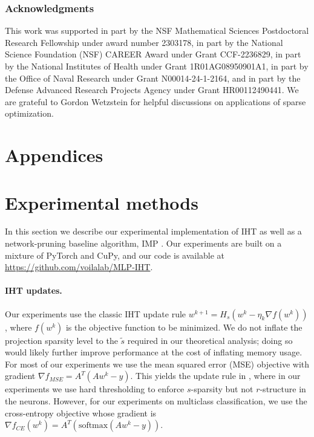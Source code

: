 \documentclass{article} %
\newcommand{\measurement}{y}
\newcommand{\w}{\ensuremath{w}}
\newcommand{\1}{\ensuremath{{\sf (i)}}}
\newcommand{\2}{\ensuremath{{\sf (ii)}}}
\newcommand{\3}{\ensuremath{{\sf (iii)}}}
\newcommand{\4}{\ensuremath{{\sf (iv)}}}
\newcommand{\5}{\ensuremath{{\sf (v)}}}
\newcommand{\6}{\ensuremath{{\sf (vi)}}}
\begin{document}
\subsubsection*{Acknowledgments}
This work was supported in part by the NSF Mathematical Sciences Postdoctoral Research Fellowship under award number 2303178, in part by the National Science Foundation (NSF) CAREER Award under Grant CCF-2236829, in part by the National Institutes of Health under Grant 1R01AG08950901A1, in part by the Office of Naval Research under Grant N00014-24-1-2164, and in part by the Defense Advanced Research Projects Agency under Grant HR00112490441.
We are grateful to Gordon Wetzstein for helpful discussions on applications of sparse optimization.


\clearpage




\clearpage
\appendix
\section*{Appendices}



\section{Experimental methods}
\label{sec:experimental_methods}

In this section we describe our experimental implementation of IHT as well as a network-pruning baseline algorithm, IMP \citep{frankle2018lottery}. Our experiments are built on a mixture of PyTorch and CuPy, and our code is available at \url{https://github.com/voilalab/MLP-IHT}.

\paragraph{IHT updates.}
Our experiments use the classic IHT update rule $\w^{k+1} = H_s(\w^k - \eta_k\nabla f(\w^k))$, where $f(\w^k)$ is the objective function to be minimized. We do not inflate the projection sparsity level to the $\tilde s$ required in our theoretical analysis; doing so would likely further improve performance at the cost of inflating memory usage. For most of our experiments we use the mean squared error (MSE) objective with gradient $\nabla f_{MSE} = A^T(A\w^k - \measurement)$. This yields the update rule in , where in our experiments we use hard thresholding to enforce $s$-sparsity but not $r$-structure in the neurons. However, for our experiments on multiclass classification, we use the cross-entropy objective whose gradient is $\nabla f_{CE}(\w^k) = A^T(\text{softmax}(A\w^k - \measurement))$.
\end{document}
